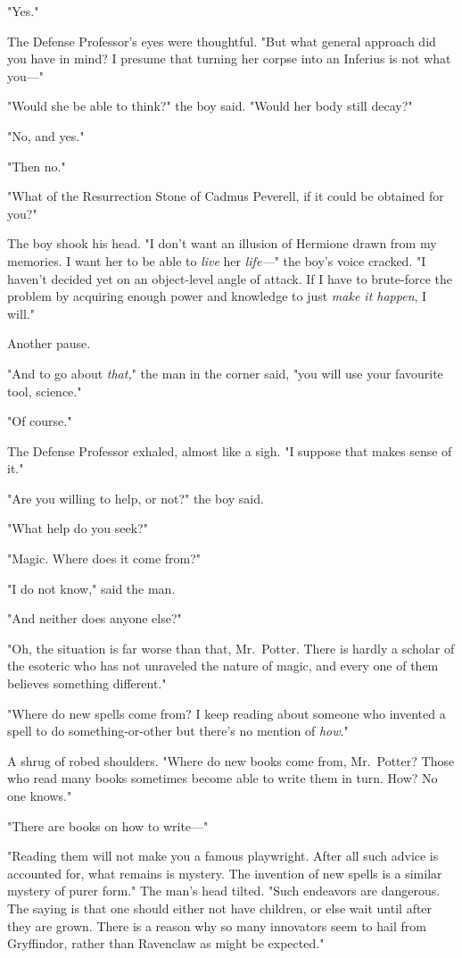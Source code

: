 "Yes."

The Defense Professor's eyes were thoughtful. "But what general approach did
you have in mind? I presume that turning her corpse into an Inferius is not
what you---"

"Would she be able to think?" the boy said. "Would her body still decay?"

"No, and yes."

"Then no."

"What of the Resurrection Stone of Cadmus Peverell, if it could be obtained for
you?"

The boy shook his head. "I don't want an illusion of Hermione drawn from my
memories. I want her to be able to \emph{live} her \emph{life---}" the boy's
voice cracked. "I haven't decided yet on an object-level angle of attack. If I
have to brute-force the problem by acquiring enough power and knowledge to just
\emph{make it happen}, I will."

Another pause.

"And to go about \emph{that,}" the man in the corner said, "you will use your
favourite tool, science."

"Of course."

The Defense Professor exhaled, almost like a sigh. "I suppose that makes sense
of it."

"Are you willing to help, or not?" the boy said.

"What help do you seek?"

"Magic. Where does it come from?"

"I do not know," said the man.

"And neither does anyone else?"

"Oh, the situation is far worse than that, Mr.~Potter. There is hardly a
scholar of the esoteric who has not unraveled the nature of magic, and every
one of them believes something different."

"Where do new spells come from? I keep reading about someone who invented a
spell to do something-or-other but there's no mention of \emph{how}."

A shrug of robed shoulders. "Where do new books come from, Mr.~Potter? Those
who read many books sometimes become able to write them in turn. How? No one
knows."

"There are books on how to write---"

"Reading them will not make you a famous playwright. After all such advice is
accounted for, what remains is mystery. The invention of new spells is a
similar mystery of purer form." The man's head tilted. "Such endeavors are
dangerous. The saying is that one should either not have children, or else wait
until after they are grown. There is a reason why so many innovators seem to
hail from Gryffindor, rather than Ravenclaw as might be expected."

